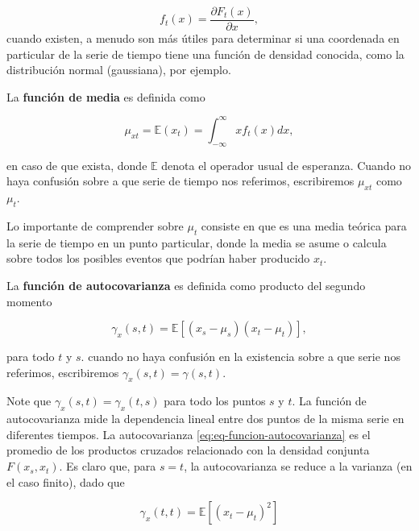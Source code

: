 \documentclass[12pt,]{krantz}
\theoremstyle{definition}
\theoremstyle{definition}
\theoremstyle{definition}
\theoremstyle{remark}
\let\BeginKnitrBlock\begin \let\EndKnitrBlock\end
\begin{document}
\[f_t(x)=\frac{\partial F_t(x)}{\partial x},\] cuando existen, a menudo
son más útiles para determinar si una coordenada en particular de la
serie de tiempo tiene una función de densidad conocida, como la
distribución normal (gaussiana), por ejemplo.

\BeginKnitrBlock{definition}
\protect\hypertarget{def:defi-funcion-media}{}{\label{def:defi-funcion-media}
}La \textbf{función de media} es definida como

\begin{equation}
\mu_{xt}=\mathbb{E}(x_t)=\int_{-\infty}^{\infty}xf_t(x)dx,
\label{eq:eq-funcion-media}
\end{equation}

en caso de que exista, donde \(\mathbb{E}\) denota el operador usual de
esperanza. Cuando no haya confusión sobre a que serie de tiempo nos
referimos, escribiremos \(\mu_{xt}\) como \(\mu_t\).
\EndKnitrBlock{definition}

Lo importante de comprender sobre \(\mu_t\) consiste en que es una media
teórica para la serie de tiempo en un punto particular, donde la media
se asume o calcula sobre todos los posibles eventos que podrían haber
producido \(x_t\).

\BeginKnitrBlock{definition}
\protect\hypertarget{def:defi-funcion-autocovarianza}{}{\label{def:defi-funcion-autocovarianza}
}La \textbf{función de autocovarianza} es definida como producto del
segundo momento

\begin{equation}
\gamma_x(s,t)=\mathbb{E}[(x_s-\mu_s)(x_t-\mu_t)],
\label{eq:eq-funcion-autocovarianza}
\end{equation}

para todo \(t\) y \(s\). cuando no haya confusión en la existencia sobre
a que serie nos referimos, escribiremos \(\gamma_x(s,t)=\gamma(s,t)\).
\EndKnitrBlock{definition}

Note que \(\gamma_x(s,t)=\gamma_x(t,s)\) para todo los puntos \(s\) y
\(t\). La función de autocovarianza mide la dependencia lineal entre dos
puntos de la misma serie en diferentes tiempos. La autocovarianza
\eqref{eq:eq-funcion-autocovarianza} es el promedio de los productos
cruzados relacionado con la densidad conjunta \(F(x_s,x_t)\). Es claro
que, para \(s=t\), la autocovarianza se reduce a la varianza (en el caso
finito), dado que

\begin{equation}
\gamma_x(t,t)=\mathbb{E}[(x_t-\mu_t)^2]
\label{eq:eq-funcion-autocovarianza-varianza}
\end{equation}
\end{document}
